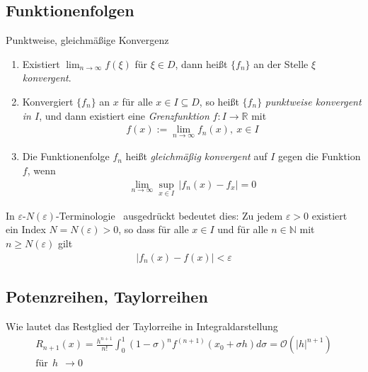 \subsection{Funktionenfolgen}
\begin{karte}{Punktweise, gleichmäßige Konvergenz}
	{\normalsize
		\begin{enumerate}[label=\(\triangleright \)]
			\item Existiert \(\displaystyle\lim_{n\to\infty}f(\xi)\) für \(\xi\in D \), dann heißt \( \{ f_n \} \) an der Stelle \( \xi \) \emph{konvergent}.
			\item Konvergiert \( \{ f_n \} \) an \(x\) für alle \(x\in I \subseteq D\), so heißt \( \{ f_n \} \) \emph{punktweise konvergent in \(I\)}, und dann existiert eine \emph{Grenzfunktion} \(f:I\to\mathbb{R}\) mit
			      \begin{align}
			      	f(x):=\lim_{n\to\infty}f_{n}(x),\ x\in I
			      \end{align}
			\item Die Funktionenfolge \(f_{n}\) heißt \emph{gleichmäßig konvergent} auf \( I \) gegen die Funktion \( f \), wenn
			      \begin{align}
			      	\lim_{n\to\infty} \sup_{x\in I}\, \lvert f_{n}(x)-f_{x}\rvert = 0
			      \end{align}
		\end{enumerate}
		In \glqq\(\varepsilon\)-\(N(\varepsilon)\)-Terminologie \grqq\ ausgedrückt bedeutet dies:
		Zu jedem \(\varepsilon > 0\) existiert ein Index \(N=N(\varepsilon)>0\), so dass für alle \(x\in I\) und für alle \(n\in\mathbb{N}\) mit \(n\geq N(\varepsilon)\) gilt
		\begin{align}
			\lvert f_{n}(x)-f(x)\rvert < \varepsilon
		\end{align}
	}
\end{karte}

\subsection{Potenzreihen, Taylorreihen}
\begin{karte}{Wie lautet das Restglied der Taylorreihe in Integraldarstellung}
	\begin{multline}
		R_{n+1}(x)=\frac{h^{n+1}}{n!}\int_{0}^1{(1-\sigma)}^{n}f^{(n+1)}(x_{0}+\sigma h)d\sigma=\mathcal{O}({\lvert h\rvert}^{n+1})\\ \text{für}\ \ h\ \ \to 0
	\end{multline}
\end{karte}

